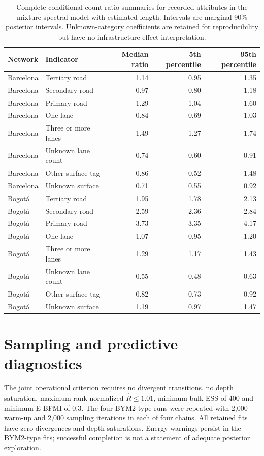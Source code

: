 \documentclass[11pt]{article}
\begin{document}
\begin{table}[!htbp]\centering\small
\caption{Complete conditional count-ratio summaries for recorded attributes in the mixture spectral model with estimated length. Intervals are marginal 90\% posterior intervals. Unknown-category coefficients are retained for reproducibility but have no infrastructure-effect interpretation.}
\begin{tabular}{llrrr}\toprule Network & Indicator & Median ratio & 5th percentile & 95th percentile\\\midrule
Barcelona & Tertiary road & 1.14 & 0.95 & 1.35 \\
Barcelona & Secondary road & 0.97 & 0.80 & 1.18 \\
Barcelona & Primary road & 1.29 & 1.04 & 1.60 \\
Barcelona & One lane & 0.84 & 0.69 & 1.03 \\
Barcelona & Three or more lanes & 1.49 & 1.27 & 1.74 \\
Barcelona & Unknown lane count & 0.74 & 0.60 & 0.91 \\
Barcelona & Other surface tag & 0.86 & 0.52 & 1.48 \\
Barcelona & Unknown surface & 0.71 & 0.55 & 0.92 \\
Bogot\'a & Tertiary road & 1.95 & 1.78 & 2.13 \\
Bogot\'a & Secondary road & 2.59 & 2.36 & 2.84 \\
Bogot\'a & Primary road & 3.73 & 3.35 & 4.17 \\
Bogot\'a & One lane & 1.07 & 0.95 & 1.20 \\
Bogot\'a & Three or more lanes & 1.29 & 1.17 & 1.43 \\
Bogot\'a & Unknown lane count & 0.55 & 0.48 & 0.63 \\
Bogot\'a & Other surface tag & 0.82 & 0.73 & 0.92 \\
Bogot\'a & Unknown surface & 1.19 & 0.97 & 1.47 \\
\bottomrule\end{tabular}\end{table}
\FloatBarrier
\section{Sampling and predictive diagnostics}
The joint operational criterion requires no divergent transitions, no depth saturation, maximum rank-normalized $\widehat R\leq1.01$, minimum bulk ESS of 400 and minimum E-BFMI of 0.3. The four BYM2-type runs were repeated with 2,000 warm-up and 2,000 sampling iterations in each of four chains. All retained fits have zero divergences and depth saturations. Energy warnings persist in the BYM2-type fits; successful completion is not a statement of adequate posterior exploration.
\end{document}
